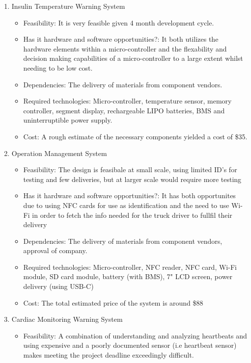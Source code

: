 \begin{enumerate}
  \item Insulin Temperature Warning System
        \begin{itemize}
          \item Feasibility: It is very feasible given 4 month development cycle.
          \item Has it hardware and software opportunities?: It both utilizes the hardware elements within a micro-controller and the flexability and decision making capabilities of a micro-controller to a large extent whilst needing to be low cost.
          \item Dependencies: The delivery of materials from component vendors.
          \item Required technologies: Micro-controller, temperature sensor, memory controller, segment display, rechargeable LIPO batteries, BMS and uninterruptible power supply.
          \item Cost: A rough estimate of the necessary components yielded a cost of \$35.
        \end{itemize}
	\item Operation Management System
	\begin{itemize}
	 \item Feasibility: The design is feasibale at small scale, using limited ID's for testing and few deliveries, but at larger scale would require more testing
          \item Has it hardware and software opportunities?: It has both opportunites due to using NFC cards for use as identification and the need to use Wi-Fi in order to fetch the info needed for the truck driver to fullfil their delivery
          \item Dependencies: The delivery of materials from component vendors, approval of company.
          \item Required technologies: Micro-controller, NFC reader, NFC card, Wi-Fi module, SD card module, battery (with BMS), 7" LCD screen, power delivery (using USB-C)
          \item Cost: The total estimated price of the system is around \$88
	\end{itemize}
        \item Cardiac Monitoring Warning System
        \begin{itemize}
          \item Feasibility: A combination of understanding and analyzing heartbeats and using expensive and a poorly documented sensor (i.e heartbeat sensor) makes meeting the project deadline exceedingly difficult.

\end{itemize}
\end{enumerate}
